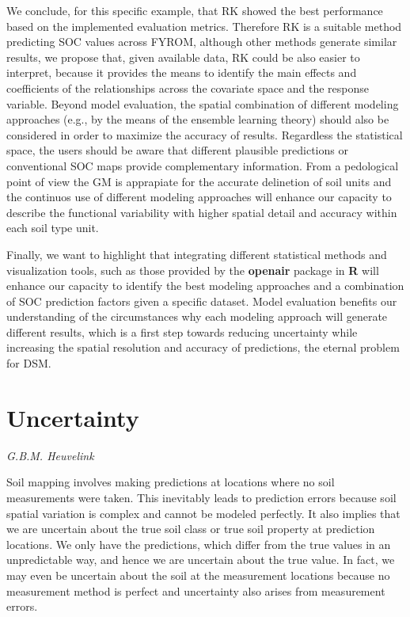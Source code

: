 \documentclass[10pt,b5paper,]{book}
\theoremstyle{definition}
\theoremstyle{definition}
\theoremstyle{definition}
\theoremstyle{remark}
\begin{document}
We conclude, for this specific example, that RK showed the best
performance based on the implemented evaluation metrics. Therefore RK is
a suitable method predicting SOC values across FYROM, although other
methods generate similar results, we propose that, given available data,
RK could be also easier to interpret, because it provides the means to
identify the main effects and coefficients of the relationships across
the covariate space and the response variable. Beyond model evaluation,
the spatial combination of different modeling approaches (e.g., by the
means of the ensemble learning theory) should also be considered in
order to maximize the accuracy of results. Regardless the statistical
space, the users should be aware that different plausible predictions or
conventional SOC maps provide complementary information. From a
pedological point of view the GM is apprapiate for the accurate
delinetion of soil units and the continuos use of different modeling
approaches will enhance our capacity to describe the functional
variability with higher spatial detail and accuracy within each soil
type unit.

Finally, we want to highlight that integrating different statistical
methods and visualization tools, such as those provided by the
\textbf{openair} package in \textbf{R} \citep{openair} will enhance our
capacity to identify the best modeling approaches and a combination of
SOC prediction factors given a specific dataset. Model evaluation
benefits our understanding of the circumstances why each modeling
approach will generate different results, which is a first step towards
reducing uncertainty while increasing the spatial resolution and
accuracy of predictions, the eternal problem for DSM.

\hypertarget{uncertainty}{%
\chapter{Uncertainty}\label{uncertainty}}

\emph{G.B.M. Heuvelink}

Soil mapping involves making predictions at locations where no soil
measurements were taken. This inevitably leads to prediction errors
because soil spatial variation is complex and cannot be modeled
perfectly. It also implies that we are uncertain about the true soil
class or true soil property at prediction locations. We only have the
predictions, which differ from the true values in an unpredictable way,
and hence we are uncertain about the true value. In fact, we may even be
uncertain about the soil at the measurement locations because no
measurement method is perfect and uncertainty also arises from
measurement errors.
\end{document}
